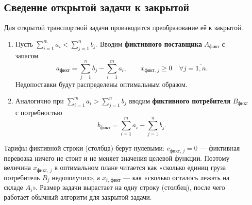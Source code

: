 \subsection{Сведение открытой задачи к закрытой}

Для открытой транспортной задачи производится преобразование её к закрытой.

\begin{enumerate}[label=\arabic*),left=0pt]
  \item Пусть $\displaystyle\sum_{i=1}^{m} a_i < \sum_{j=1}^{n} b_j$. Вводим
        \textbf{фиктивного поставщика} $A_{\text{фикт}}$ с запасом
        \[
          a_{\text{фикт}} = \sum_{j=1}^{n} b_j - \sum_{i=1}^{m} a_i ,
          \qquad x_{\text{фикт},\,j} \ge 0 \quad \forall j = \overline{1,n} .
        \]
        Недопоставки будут распределены оптимальным образом.
  \item Аналогично при $\displaystyle\sum_{i=1}^{m} a_i > \sum_{j=1}^{n} b_j$
        вводим \textbf{фиктивного потребителя} $B_{\text{фикт}}$ с потребностью
        \[
          b_{\text{фикт}} = \sum_{i=1}^{m} a_i - \sum_{j=1}^{n} b_j .
        \]
\end{enumerate}

\begin{idea}
Тарифы фиктивной строки (столбца) берут нулевыми: $c_{\text{фикт},\,j} = 0$ —
фиктивная перевозка ничего не стоит и не меняет значения целевой функции.
Поэтому величина $x_{\text{фикт},\,j}$ в оптимальном плане читается как
«сколько единиц груза потребитель $B_j$ недополучил», а
$x_{i,\,\text{фикт}}$ — как «сколько осталось лежать на складе $A_i$».
Размер задачи вырастает на одну строку (столбец), после чего работает обычный
алгоритм для закрытой задачи.
\end{idea}
